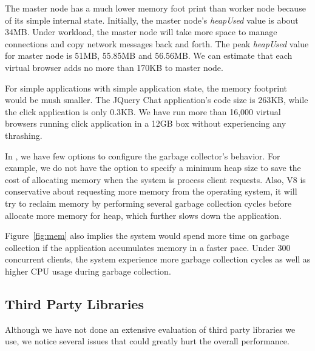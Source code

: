 The master node has a much lower memory foot print than worker node
because of its simple internal state.
Initially, the master node's \emph{heapUsed} value is about 34MB.
Under workload, the master node will take more space to manage connections and
copy network messages back and forth.
The peak \emph{heapUsed} value for master node is 51MB, 55.85MB and 56.56MB.
We can estimate that each virtual browser adds no more than 170KB to master node.

For simple applications with simple application state, the memory footprint would be mush smaller.
The JQuery Chat application's code size is 263KB, while the click application is only 0.3KB.
We have run more than 16,000 virtual browsers running click application in a 12GB box without
experiencing any thrashing.

In \nodejs{}, we have few options to configure the garbage collector's behavior.
For example, we do not have the option to specify a minimum heap size to save
the cost of allocating memory when the system is process client requests.
Also, V8 is conservative about requesting more memory from the operating system, %
it will try to reclaim memory by performing several garbage collection cycles before 
allocate more memory for heap, %
which further slows down the application.

Figure~\ref{fig:mem} also implies the system would spend more time on garbage collection if
the application accumulates memory in a faster pace.
Under 300 concurrent clients, the system experience more garbage collection cycles as
well as higher CPU usage during garbage collection.


\subsection{Third Party Libraries}
Although we have not done an extensive evaluation of third party libraries we use,
we notice several issues that could greatly hurt the overall performance.

